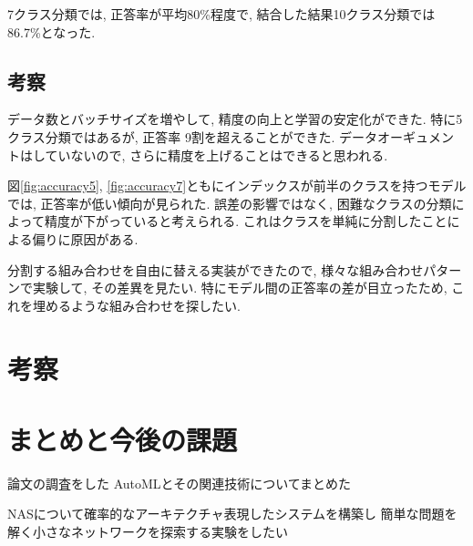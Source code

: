 \documentclass[twocolumn]{jarticle}     %
\begin{document}
7クラス分類では, 正答率が平均80\%程度で, 結合した結果10クラス分類では86.7\%となった.

\subsection{考察}
データ数とバッチサイズを増やして, 精度の向上と学習の安定化ができた. 特に5クラス分類ではあるが, 正答率 9割を超えることができた. データオーギュメントはしていないので, さらに精度を上げることはできると思われる.

図\ref{fig:accuracy5}, \ref{fig:accuracy7}ともにインデックスが前半のクラスを持つモデルでは, 正答率が低い傾向が見られた. 誤差の影響ではなく, 困難なクラスの分類によって精度が下がっていると考えられる. これはクラスを単純に分割したことによる偏りに原因がある.

分割する組み合わせを自由に替える実装ができたので, 様々な組み合わせパターンで実験して, その差異を見たい.
特にモデル間の正答率の差が目立ったため, これを埋めるような組み合わせを探したい.


\section{考察}

\section{まとめと今後の課題}
論文の調査をした
AutoMLとその関連技術についてまとめた

NASについて確率的なアーキテクチャ表現したシステムを構築し
簡単な問題を解く小さなネットワークを探索する実験をしたい



\end{document}
